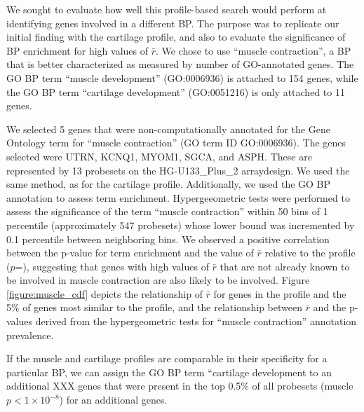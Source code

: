 \documentclass{bioinfo}
\begin{document}
We sought to evaluate how well this profile-based search would perform at
identifying genes involved in a different BP.  The purpose was to replicate our
initial finding with the cartilage profile, and also to evaluate the
significance of BP enrichment for high values of $\bar{r}$.  We chose to use
``muscle contraction'', a BP that is better characterized as measured by number
of GO-annotated genes.  The GO BP term ``muscle development'' (GO:0006936) is
attached to 154 genes, while the GO BP term ``cartilage development''
(GO:0051216) is only attached to 11 genes.


We selected 5 genes that were non-computationally annotated for the Gene
Ontology term for ``muscle contraction'' (GO term ID GO:0006936).  The genes
selected were UTRN, KCNQ1, MYOM1, SGCA, and ASPH.  These are represented by 13
probesets on the HG-U133\_Plus\_2 arraydesign.  We used the same method, as for
the cartilage profile.  Additionally, we used the GO BP annotation to assess
term enrichment.  Hypergeeometric tests were performed to assess the
significance of the term ``muscle contraction'' within 50 bins of 1 percentile
(approximately 547 probesets) whose lower bound was incremented by 0.1
percentile between neighboring bins.  We observed a positive correlation
between the p-value for term enrichment and the value of $\bar{r}$ relative to
the profile ($p$=), suggesting that genes with high
values of $\bar{r}$ that are not already known to be involved in muscle
contraction are also likely to be involved.  Figure \ref{figure:muscle_cdf}
depicts the relationship of $\bar{r}$ for genes in the profile and the 5\% of
genes most similar to the profile, and the relationship between $\bar{r}$ and
the p-values derived from the hypergeometric tests for ``muscle contraction''
annotation prevalence.


If the muscle and cartilage profiles are comparable in their specificity for a
particular BP, we can assign the GO BP term ``cartilage development to an
additional XXX genes that were present in the top 0.5\% of all probesets
(muscle $p<1{\times}10^{-8}$) for an additional  genes.
\end{document}
